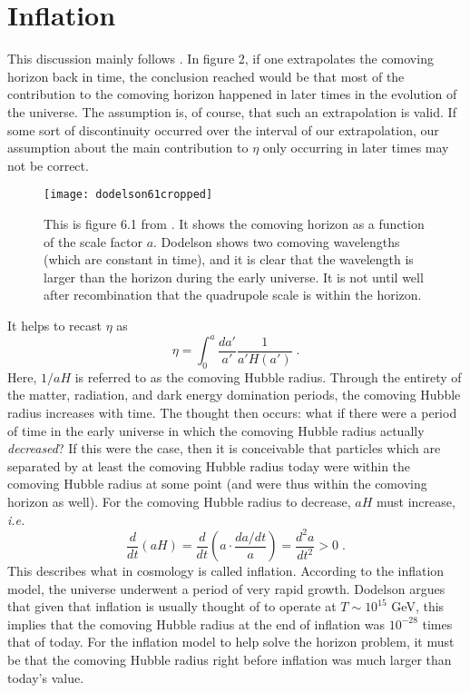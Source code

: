 \documentclass[aps,reprint,prl]{revtex4-1}
\begin{document}
\section*{Inflation}
This discussion mainly follows \cite{Dodelson}.  In figure 2, if one extrapolates the comoving horizon back in time, the conclusion reached would be that most of the contribution to the comoving horizon happened in later times in the evolution of the universe.  The assumption is, of course, that such an extrapolation is valid.  If some sort of discontinuity occurred over the interval of our extrapolation, our assumption about the main contribution to $\eta$ only occurring in later times may not be correct.  
\begin{figure}[h] \label{fig:dodelson61}
\texttt{[image: dodelson61cropped]}
\caption{This is figure 6.1 from \cite{Dodelson}.  It shows the comoving horizon as a function of the scale factor $a$.  Dodelson shows two comoving wavelengths (which are constant in time), and it is clear that the wavelength is larger than the horizon during the early universe.  It is not until well after recombination that the quadrupole scale is within the horizon.}
\end{figure}
It helps to recast $\eta$ as
\begin{equation}
\eta=\int_0^a\frac{da'}{a'}\frac{1}{a'H(a')}\;.
\end{equation}
Here, $1/aH$ is referred to as the comoving Hubble radius.  Through the entirety of the matter, radiation, and dark energy domination periods, the comoving Hubble radius increases with time.  The thought then occurs: what if there were a period of time in the early universe in which the comoving Hubble radius actually \emph{decreased}?  If this were the case, then it is conceivable that particles which are separated by at least the comoving Hubble radius today were within the comoving Hubble radius at some point (and were thus within the comoving horizon as well).  For the comoving Hubble radius to decrease, $aH$ must increase, \emph{i.e.}
$$\frac{d}{dt}(aH)=\frac{d}{dt}\left(a\cdot\frac{da/dt}{a}\right)=\frac{d^2a}{dt^2}>0\;.$$
This describes what in cosmology is called inflation.  According to the inflation model, the universe underwent a period of very rapid growth.  Dodelson argues that given that inflation is usually thought of to operate at $T\sim10^{15}$ GeV, this implies that the comoving Hubble radius at the end of inflation was $10^{-28}$ times that of today.  For the inflation model to help solve the horizon problem, it must be that the comoving Hubble radius right before inflation was much larger than today's value.  
\end{document}
